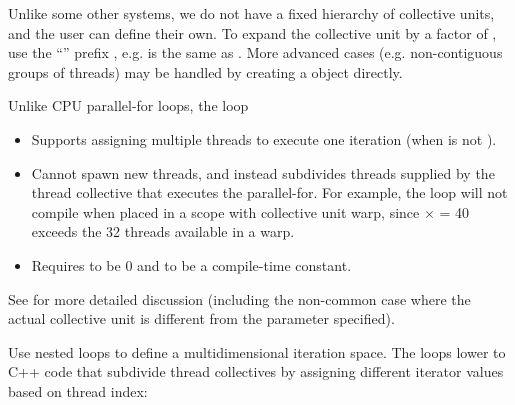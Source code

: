 \filbreak
Unlike some other systems, we do not have a fixed hierarchy of collective units, and the user can define their own.
To expand the collective unit by a factor of , use the ``'' prefix , e.g.  is the same as .
More advanced cases (e.g. non-contiguous groups of threads) may be handled by creating a  object directly.

\filbreak
Unlike CPU parallel-for loops, the  loop
\begin{itemize}
  \item Supports assigning multiple threads to execute one iteration (when  is not ).
  \item Cannot spawn new threads, and instead subdivides threads supplied by the thread collective that executes the parallel-for.
    For example, the loop  will not compile when placed in a scope with collective unit warp, since  $\times$  = 40 exceeds the 32 threads available in a warp.
  \item Requires  to be 0 and  to be a compile-time constant.
\end{itemize}

See  for more detailed discussion (including the non-common case where the actual collective unit is different from the  parameter specified).

\filbreak
Use nested  loops to define a multidimensional iteration space.
The  loops lower to C++ code that subdivide thread collectives by assigning different iterator values based on thread index:



